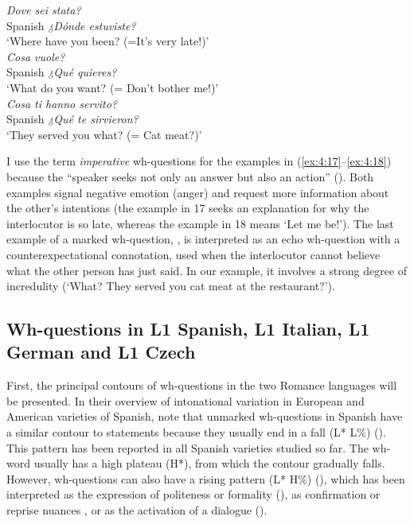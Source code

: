 \ex\label{ex:4:17}       \textit{Dove sei stata?}\\
Spanish   \textit{¿Dónde estuviste?}\\
{} {‘Where have you been? (=It’s very late!)’}\\



\ex\label{ex:4:18}      \textit{Cosa vuole?}\\
Spanish   \textit{¿Qué quieres?}\\
{}      {‘What do you want? (= Don’t bother me!)’}\\



\ex\label{ex:4:19}      \textit{Cosa ti hanno servito?}\\
Spanish   \textit{¿Qué te sirvieron?}\\
{}      {‘They served you what? (= Cat meat?)’}\\
\z



I use the term \textit{imperative} wh-questions for the examples in (\ref{ex:4:17}--\ref{ex:4:18}) because the “speaker seeks not only an answer but also an action” (\citealt[38]{Estebas-VilaplanaPrieto2010}). Both examples signal negative emotion (anger) and request more information about the other’s intentions (the example in 17 seeks an explanation for why the interlocutor is so late, whereas the example in 18 means ‘Let me be!’). The last example of a marked wh-question, , is interpreted as an echo wh-question with a counterexpectational connotation, used when the interlocutor cannot believe what the other person has just said. In our example, it involves a strong degree of incredulity (‘What? They served you cat meat at the restaurant?’).

\subsection{Wh-questions in L1 Spanish, L1 Italian, L1 German and L1 Czech}\label{sec:4.4.1}

First, the principal contours of wh-questions in the two Romance languages will be presented. In their overview of intonational variation in European and American varieties of Spanish, \citet{HualdePrieto2015} note that unmarked wh-questions in Spanish have a similar contour to statements because they usually end in a fall (L* L\%) (). This pattern has been reported in all Spanish varieties studied so far. The wh-word usually has a high plateau (H*), from which the contour gradually falls. However, wh-questions can also have a rising pattern (L* H\%) (), which has been interpreted as the expression of politeness or formality (\citealt{NavarroTomás1948, Quilis1993, Henriksen2010}), as confirmation or reprise nuances \citep{Sosa2003}, or as the activation of a dialogue (\citealt{Estebas-VilaplanaPrieto2010}).

